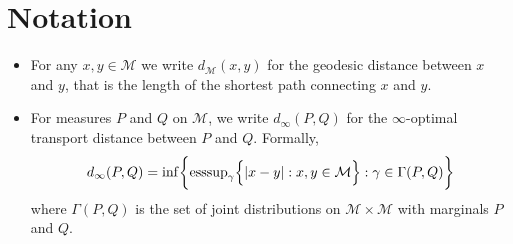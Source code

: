 \documentclass{article}
\newcommand{\abs}[1]{\left \lvert #1 \right \rvert}
\newcommand{\1}{\mathbf{1}}
\newcommand{\mc}[1]{\mathcal{#1}}
\theoremstyle{alden}
\theoremstyle{aldenthm}
\theoremstyle{definition}
\theoremstyle{remark}
\begin{document}
\section{Notation}

\begin{itemize}
	\item For any $x,y \in \mc{M}$ we write $d_{\mc{M}}(x,y)$ for the geodesic distance between $x$ and $y$, that is the length of the shortest path connecting $x$ and $y$. 
	\item For measures $P$ and $Q$ on $\mc{M}$, we write $d_{\infty}(P,Q)$ for the $\infty$-optimal transport distance between $P$ and $Q$. Formally,
	\begin{equation*}
	d_{\infty}(P,Q) = \inf\biggl\{ \mathrm{esssup}_{\gamma}\Bigl\{\abs{x - y}: x,y \in \mc{M} \Bigr\} : \gamma \in \Gamma(P,Q) \biggr\}
	\end{equation*}
	where $\Gamma(P,Q)$ is the set of joint distributions on $\mc{M} \times \mc{M}$ with marginals $P$ and $Q$.
	
\end{itemize}


 
\end{document}

